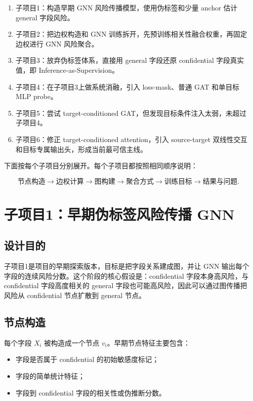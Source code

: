 \documentclass[UTF8]{ctexart}
\begin{document}
\begin{enumerate}
    \item 子项目1：构造早期 GNN 风险传播模型，使用伪标签和少量 anchor 估计 general 字段风险。
    \item 子项目2：把边权构造和 GNN 训练拆开，先预训练相关性融合权重，再固定边权进行 GNN 风险聚合。
    \item 子项目3：放弃伪标签体系，直接用 general 字段还原 confidential 字段真实值，即 Inference-as-Supervision。
    \item 子项目4：在子项目3上做系统消融，引入 loss-mask、普通 GAT 和单目标 MLP probe。
    \item 子项目5：尝试 target-conditioned GAT，但发现目标条件注入太弱，未超过子项目4。
    \item 子项目6：修正 target-conditioned attention，引入 source-target 双线性交互和目标专属输出头，形成当前最可信主线。
\end{enumerate}

下面按每个子项目分别展开。每个子项目都按照相同顺序说明：

\[
\text{节点构造}
\rightarrow
\text{边权计算}
\rightarrow
\text{图构建}
\rightarrow
\text{聚合方式}
\rightarrow
\text{训练目标}
\rightarrow
\text{结果与问题}.
\]

\section{子项目1：早期伪标签风险传播 GNN}

\subsection{设计目的}

子项目1是项目的早期探索版本，目标是把字段关系建成图，并让 GNN 输出每个字段的连续风险分数。这个阶段的核心假设是：confidential 字段本身高风险，与 confidential 字段高度相关的 general 字段也可能高风险，因此可以通过图传播把风险从 confidential 节点扩散到 general 节点。

\subsection{节点构造}

每个字段 \(X_i\) 被构造成一个节点 \(v_i\)。早期节点特征主要包含：
\begin{itemize}
    \item 字段是否属于 confidential 的初始敏感度标记；
    \item 字段的简单统计特征；
    \item 字段到 confidential 字段的相关性或伪推断分数。
\end{itemize}
\end{document}
